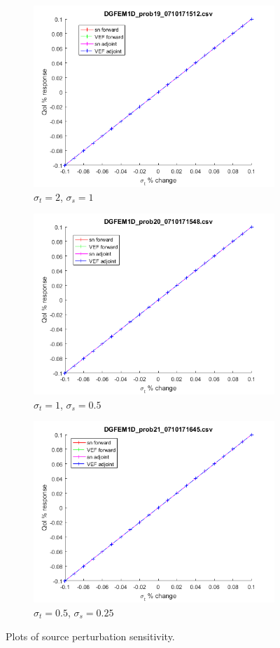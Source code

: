 \documentclass{article}
\newcommand{\sigt}{\sigma_t}
\newcommand{\sigs}{\sigma_s}
\begin{document}
\begin{figure}[H]
\label{HomoPertq}
\begin{subfigure}{.5\textwidth}
  \centering
  \includegraphics[width=.8\linewidth]{figures/19qSens.png}
  \caption{$\sigt=2$, $\sigs=1$}
  \label{fig:sfig1}
\end{subfigure}%
\begin{subfigure}{.5\textwidth}
  \centering
  \includegraphics[width=.8\linewidth]{figures/20qSens.png}
  \caption{$\sigt=1$, $\sigs=0.5$}
  \label{fig:sfig2}
\end{subfigure}
\begin{subfigure}{.5\textwidth}
  \centering
  \includegraphics[width=.8\linewidth]{figures/21qSens.png}
  \caption{$\sigt=0.5$, $\sigs=0.25$}
  \label{fig:sfig3}
\end{subfigure}
\caption{Plots of source perturbation sensitivity.}
\label{fig:fig}
\end{figure}
\end{document}
